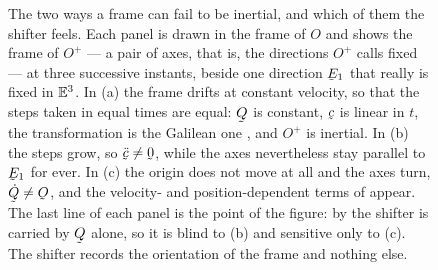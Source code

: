 \begin{figure}[htbp]
\caption{The two ways a frame can fail to be inertial, and which of them
the shifter feels. Each panel is drawn in the frame of $O$ and shows the
frame of $O^{+}$ --- a pair of axes, that is, the directions $O^{+}$
calls fixed --- at three successive instants, beside one direction
$\bE_{1}$ that really is fixed in $\mathbb{E}^{3}$. In (a) the frame drifts at
constant velocity, so that the steps taken in equal times are equal:
$\bQ$ is constant, $\bc$ is linear in $t$, the transformation is the
Galilean one , and $O^{+}$ is inertial. In (b) the steps grow,
so $\ddot\bc\neq\bze$, while the axes nevertheless stay parallel to
$\bE_{1}$ for ever. In (c) the origin does not move at all and the axes
turn, $\dot\bQ\neq\Ob$, and the velocity- and position-dependent terms
of  appear. The last line of each panel is the point of the
figure: by  the shifter is carried by $\bQ$ alone, so it is
blind to (b) and sensitive only to (c). The shifter records the
orientation of the frame and nothing else.}
\label{fig:ch7framekinds}
\end{figure}


